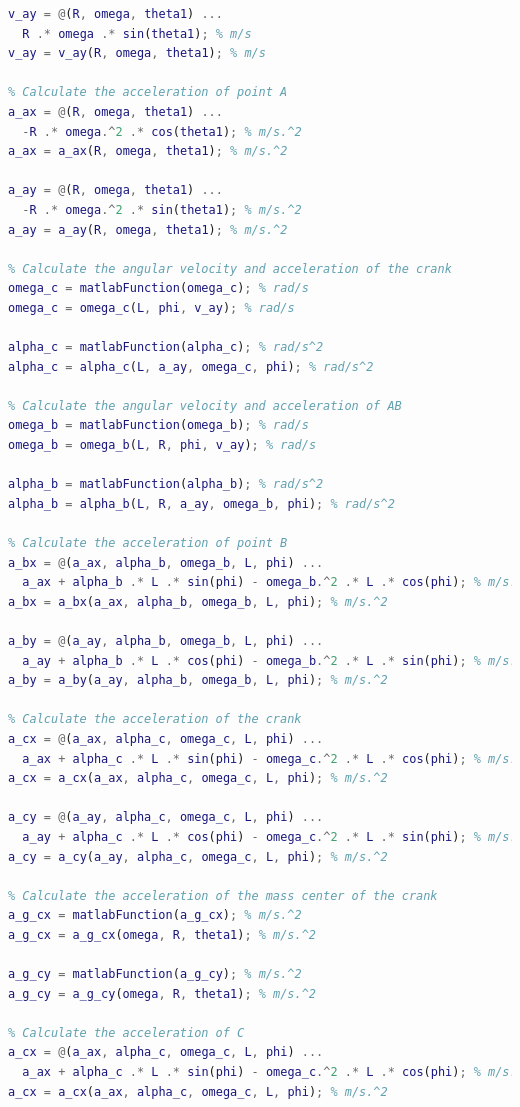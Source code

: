 \documentclass[12pt, titlepage]{article}
\begin{document}
\begin{lstlisting}[language=Matlab, style=mystyle]
v_ay = @(R, omega, theta1) ...
  R .* omega .* sin(theta1); % m/s
v_ay = v_ay(R, omega, theta1); % m/s

% Calculate the acceleration of point A
a_ax = @(R, omega, theta1) ...
  -R .* omega.^2 .* cos(theta1); % m/s.^2
a_ax = a_ax(R, omega, theta1); % m/s.^2

a_ay = @(R, omega, theta1) ...
  -R .* omega.^2 .* sin(theta1); % m/s.^2
a_ay = a_ay(R, omega, theta1); % m/s.^2

% Calculate the angular velocity and acceleration of the crank
omega_c = matlabFunction(omega_c); % rad/s
omega_c = omega_c(L, phi, v_ay); % rad/s

alpha_c = matlabFunction(alpha_c); % rad/s^2
alpha_c = alpha_c(L, a_ay, omega_c, phi); % rad/s^2

% Calculate the angular velocity and acceleration of AB
omega_b = matlabFunction(omega_b); % rad/s
omega_b = omega_b(L, R, phi, v_ay); % rad/s

alpha_b = matlabFunction(alpha_b); % rad/s^2
alpha_b = alpha_b(L, R, a_ay, omega_b, phi); % rad/s^2

% Calculate the acceleration of point B
a_bx = @(a_ax, alpha_b, omega_b, L, phi) ...
  a_ax + alpha_b .* L .* sin(phi) - omega_b.^2 .* L .* cos(phi); % m/s.^2
a_bx = a_bx(a_ax, alpha_b, omega_b, L, phi); % m/s.^2

a_by = @(a_ay, alpha_b, omega_b, L, phi) ...
  a_ay + alpha_b .* L .* cos(phi) - omega_b.^2 .* L .* sin(phi); % m/s.^2
a_by = a_by(a_ay, alpha_b, omega_b, L, phi); % m/s.^2

% Calculate the acceleration of the crank
a_cx = @(a_ax, alpha_c, omega_c, L, phi) ...
  a_ax + alpha_c .* L .* sin(phi) - omega_c.^2 .* L .* cos(phi); % m/s.^2
a_cx = a_cx(a_ax, alpha_c, omega_c, L, phi); % m/s.^2

a_cy = @(a_ay, alpha_c, omega_c, L, phi) ...
  a_ay + alpha_c .* L .* cos(phi) - omega_c.^2 .* L .* sin(phi); % m/s.^2
a_cy = a_cy(a_ay, alpha_c, omega_c, L, phi); % m/s.^2

% Calculate the acceleration of the mass center of the crank
a_g_cx = matlabFunction(a_g_cx); % m/s.^2
a_g_cx = a_g_cx(omega, R, theta1); % m/s.^2

a_g_cy = matlabFunction(a_g_cy); % m/s.^2
a_g_cy = a_g_cy(omega, R, theta1); % m/s.^2

% Calculate the acceleration of C
a_cx = @(a_ax, alpha_c, omega_c, L, phi) ...
  a_ax + alpha_c .* L .* sin(phi) - omega_c.^2 .* L .* cos(phi); % m/s.^2
a_cx = a_cx(a_ax, alpha_c, omega_c, L, phi); % m/s.^2


\end{lstlisting}
\end{document}
